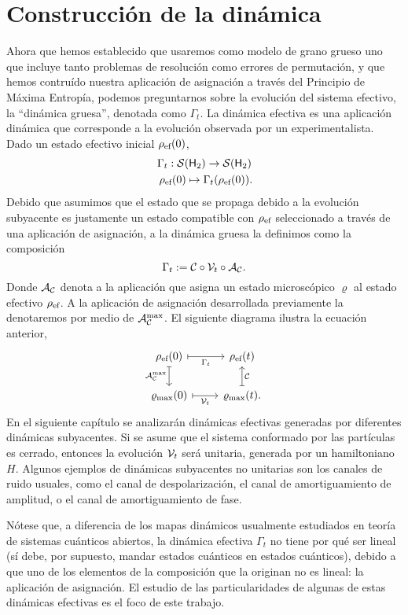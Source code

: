 \section{Construcción de la dinámica}\label{sec:ch2dycon}

Ahora que hemos establecido que usaremos como modelo de grano grueso uno que incluye tanto problemas de resolución como errores de permutación, y que hemos contruído nuestra aplicación de asignación a través del Principio de Máxima Entropía, podemos preguntarnos sobre la evolución del sistema efectivo, la ``dinámica gruesa'', denotada como $\Gamma_t$. La dinámica efectiva es una aplicación dinámica que corresponde a la evolución observada por un experimentalista. Dado un estado efectivo inicial $\rho_{\text{ef}}(0)$,
\begin{gather}
\Gamma_{t}:\mcS(\hilbert_2)\rightarrow \mcS(\hilbert_2)\nonumber\\
\rho_{\ef}(0) \mapsto \Gamma_{t}(\rho_{\ef}(0))\rlap{.}\nonumber
\end{gather}
Debido que asumimos que el estado que se propaga debido a la evolución subyacente es justamente un estado compatible con $\rho_{\text{ef}}$ seleccionado a través de una aplicación de asignación, a la dinámica gruesa la definimos como la composición
\begin{equation}
\Gamma_t:=\mathcal{C} \circ \mathcal{V}_t \circ \mathcal{A}_{\mathcal{C}}.\nonumber
\end{equation}
Donde $\mathcal{A}_{\mathcal{C}}$ denota a la aplicación que asigna un estado microscópico $\varrho$ al estado efectivo $\rho_{\text{ef}}$. A la aplicación de asignación desarrollada previamente la denotaremos por medio de $\mathcal{A}_{\mathcal{C}}^{\max}$. El siguiente diagrama ilustra la ecuación anterior,
\[\begin{tikzcd}[arrows={<-|}]
    \rho_{\ef}(0)  & \rho_{\ef}(t) \arrow{l}{\Gamma_{t}} \arrow{d}{\mcC}\\
\varrho_{\max}(0) \arrow{u}{\mcA_{\mcC}^{\max}} & \varrho_{\max}(t). \arrow{l}{\mcV_{t}}
\end{tikzcd}
\]
En el siguiente capítulo se analizarán dinámicas efectivas generadas por diferentes dinámicas subyacentes. Si se asume que el sistema conformado por las partículas es cerrado, entonces la evolución $\mathcal{V}_{t}$ será unitaria, generada por un hamiltoniano $H$. Algunos ejemplos de dinámicas subyacentes no unitarias son los canales de ruido usuales, como el canal de despolarización, el canal de amortiguamiento de amplitud, o el canal de amortiguamiento de fase.

Nótese que, a diferencia de los mapas dinámicos usualmente estudiados en teoría de sistemas cuánticos abiertos, la dinámica efectiva $\Gamma_{t}$ no tiene por qué ser lineal (sí debe, por supuesto, mandar estados cuánticos en estados cuánticos), debido a que uno de los elementos de la composición que la originan no es lineal: la aplicación de asignación. El estudio de las particularidades de algunas de estas dinámicas efectivas es el foco de este trabajo.

